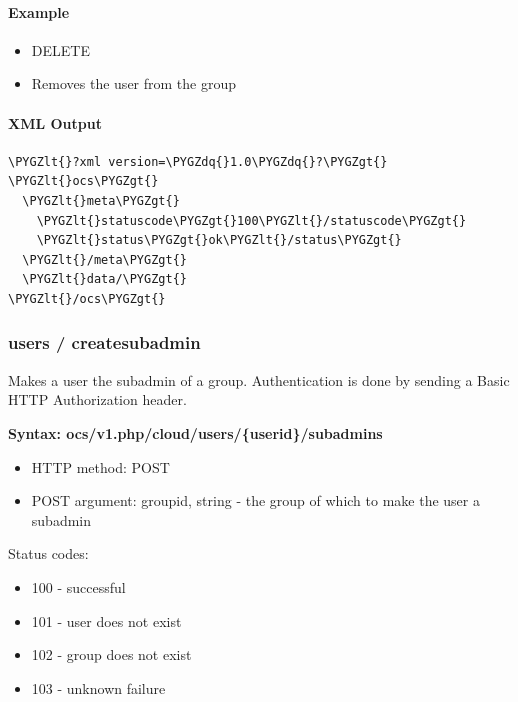 \documentclass[letterpaper,10pt,english]{sphinxmanual}
\def\PYGZlt{\char`\<}
\def\PYGZgt{\char`\>}
\def\PYGZdq{\char`\"}
\begin{document}
\paragraph{Example}
\label{configuration_user/user_provisioning_api:id12}\begin{itemize}
\item {} 
DELETE

\item {} 
Removes the user  from the group 

\end{itemize}


\paragraph{XML Output}
\label{configuration_user/user_provisioning_api:id13}
\begin{Verbatim}[commandchars=\\\{\}]
\PYGZlt{}?xml version=\PYGZdq{}1.0\PYGZdq{}?\PYGZgt{}
\PYGZlt{}ocs\PYGZgt{}
  \PYGZlt{}meta\PYGZgt{}
    \PYGZlt{}statuscode\PYGZgt{}100\PYGZlt{}/statuscode\PYGZgt{}
    \PYGZlt{}status\PYGZgt{}ok\PYGZlt{}/status\PYGZgt{}
  \PYGZlt{}/meta\PYGZgt{}
  \PYGZlt{}data/\PYGZgt{}
\PYGZlt{}/ocs\PYGZgt{}
\end{Verbatim}


\subsubsection{\textbf{users / createsubadmin}}
\label{configuration_user/user_provisioning_api:users-createsubadmin}
Makes a user the subadmin of a group. Authentication is done by sending a Basic
HTTP Authorization header.

\textbf{Syntax: ocs/v1.php/cloud/users/\{userid\}/subadmins}
\begin{itemize}
\item {} 
HTTP method: POST

\item {} 
POST argument: groupid, string - the group of which to make the user a
subadmin

\end{itemize}

Status codes:
\begin{itemize}
\item {} 
100 - successful

\item {} 
101 - user does not exist

\item {} 
102 - group does not exist

\item {} 
103 - unknown failure

\end{itemize}
\end{document}

